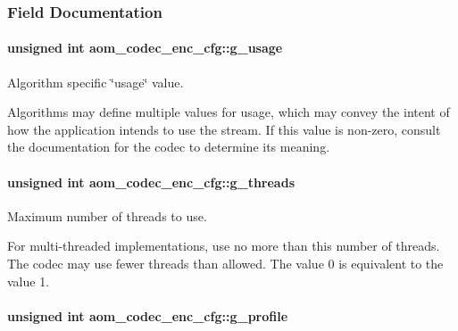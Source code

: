 \subsubsection{Field Documentation}
\paragraph[{\texorpdfstring{g\+\_\+usage}{g_usage}}]{\setlength{\rightskip}{0pt plus 5cm}unsigned int aom\+\_\+codec\+\_\+enc\+\_\+cfg\+::g\+\_\+usage}\hypertarget{structaom__codec__enc__cfg_a2aef2cdcf97e60ab36f7ca77c028e816}{}\label{structaom__codec__enc__cfg_a2aef2cdcf97e60ab36f7ca77c028e816}


Algorithm specific \char`\"{}usage\char`\"{} value. 

Algorithms may define multiple values for usage, which may convey the intent of how the application intends to use the stream. If this value is non-\/zero, consult the documentation for the codec to determine its meaning. 
\paragraph[{\texorpdfstring{g\+\_\+threads}{g_threads}}]{\setlength{\rightskip}{0pt plus 5cm}unsigned int aom\+\_\+codec\+\_\+enc\+\_\+cfg\+::g\+\_\+threads}\hypertarget{structaom__codec__enc__cfg_a55f56f04145e334cfa727df77d8378d4}{}\label{structaom__codec__enc__cfg_a55f56f04145e334cfa727df77d8378d4}


Maximum number of threads to use. 

For multi-\/threaded implementations, use no more than this number of threads. The codec may use fewer threads than allowed. The value 0 is equivalent to the value 1. 
\paragraph[{\texorpdfstring{g\+\_\+profile}{g_profile}}]{\setlength{\rightskip}{0pt plus 5cm}unsigned int aom\+\_\+codec\+\_\+enc\+\_\+cfg\+::g\+\_\+profile}\hypertarget{structaom__codec__enc__cfg_a715cb435d6eaca88eab71a763af3d8ec}{}\label{structaom__codec__enc__cfg_a715cb435d6eaca88eab71a763af3d8ec}


